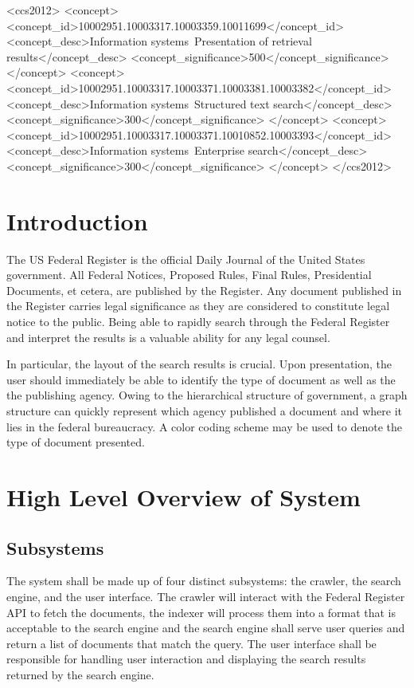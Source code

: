 \documentclass{sig-alternate-05-2015}
\begin{document}
\begin{CCSXML}
<ccs2012>
<concept>
<concept_id>10002951.10003317.10003359.10011699</concept_id>
<concept_desc>Information systems~Presentation of retrieval results</concept_desc>
<concept_significance>500</concept_significance>
</concept>
<concept>
<concept_id>10002951.10003317.10003371.10003381.10003382</concept_id>
<concept_desc>Information systems~Structured text search</concept_desc>
<concept_significance>300</concept_significance>
</concept>
<concept>
<concept_id>10002951.10003317.10003371.10010852.10003393</concept_id>
<concept_desc>Information systems~Enterprise search</concept_desc>
<concept_significance>300</concept_significance>
</concept>
</ccs2012>
\end{CCSXML}

\printccsdesc



\section{Introduction}
The US Federal Register is the official Daily Journal of the United States government. All Federal Notices, Proposed Rules, Final Rules, Presidential Documents, et cetera, are published by the Register. Any document published in the Register carries legal significance as they are considered to constitute legal notice to the public. Being able to rapidly search through the Federal Register and interpret the results is a valuable ability for any legal counsel. 

In particular, the layout of the search results is crucial. Upon presentation, the user should immediately be able to identify the type of document as well as the the publishing agency. Owing to the hierarchical structure of government, a graph structure can quickly represent which agency published a document and where it lies in the federal bureaucracy. A color coding scheme may be used to denote the type of document presented.

\section{High Level Overview of System}
\subsection{Subsystems}
The system shall be made up of four distinct subsystems: the crawler, the search engine, and the user interface. The crawler will interact with the Federal Register API to fetch the documents, the indexer will process them into a format that is acceptable to the search engine and the search engine shall serve user queries and return a list of documents that match the query. The user interface shall be responsible for handling user interaction and displaying the search results returned by the search engine.
\end{document}
